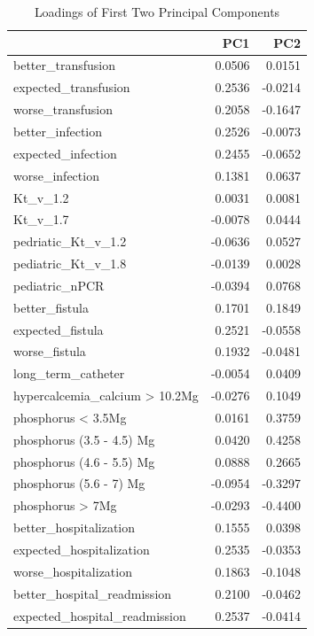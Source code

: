 \documentclass[
  letterpaper,
  DIV=11,
  numbers=noendperiod]{scrreprt}
\begin{document}
\begin{table}

\caption{Loadings of First Two Principal Components}
\centering
\begin{tabular}[t]{l|r|r}
\hline
  & PC1 & PC2\\
\hline
better\_transfusion & 0.0506 & 0.0151\\
\hline
expected\_transfusion & 0.2536 & -0.0214\\
\hline
worse\_transfusion & 0.2058 & -0.1647\\
\hline
better\_infection & 0.2526 & -0.0073\\
\hline
expected\_infection & 0.2455 & -0.0652\\
\hline
worse\_infection & 0.1381 & 0.0637\\
\hline
Kt\_v\_1.2 & 0.0031 & 0.0081\\
\hline
Kt\_v\_1.7 & -0.0078 & 0.0444\\
\hline
pedriatic\_Kt\_v\_1.2 & -0.0636 & 0.0527\\
\hline
pediatric\_Kt\_v\_1.8 & -0.0139 & 0.0028\\
\hline
pediatric\_nPCR & -0.0394 & 0.0768\\
\hline
better\_fistula & 0.1701 & 0.1849\\
\hline
expected\_fistula & 0.2521 & -0.0558\\
\hline
worse\_fistula & 0.1932 & -0.0481\\
\hline
long\_term\_catheter & -0.0054 & 0.0409\\
\hline
hypercalcemia\_calcium > 10.2Mg & -0.0276 & 0.1049\\
\hline
phosphorus < 3.5Mg & 0.0161 & 0.3759\\
\hline
phosphorus (3.5 - 4.5) Mg & 0.0420 & 0.4258\\
\hline
phosphorus (4.6 - 5.5) Mg & 0.0888 & 0.2665\\
\hline
phosphorus (5.6 - 7) Mg & -0.0954 & -0.3297\\
\hline
phosphorus > 7Mg & -0.0293 & -0.4400\\
\hline
better\_hospitalization & 0.1555 & 0.0398\\
\hline
expected\_hospitalization & 0.2535 & -0.0353\\
\hline
worse\_hospitalization & 0.1863 & -0.1048\\
\hline
better\_hospital\_readmission & 0.2100 & -0.0462\\
\hline
expected\_hospital\_readmission & 0.2537 & -0.0414\\
\hline

\end{tabular}
\end{table}
\end{document}
